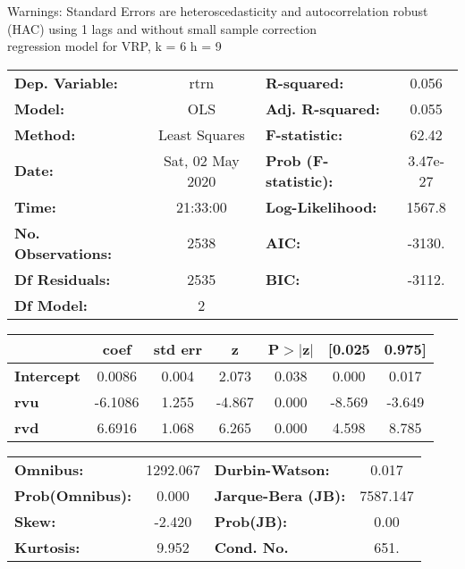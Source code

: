 Warnings: \newline
 [1] Standard Errors are heteroscedasticity and autocorrelation robust (HAC) using 1 lags and without small sample correction\\ 

regression model for VRP, k = 6 h = 9\begin{center}
\begin{tabular}{lclc}
\toprule
\textbf{Dep. Variable:}    &       rtrn       & \textbf{  R-squared:         } &     0.056   \\
\textbf{Model:}            &       OLS        & \textbf{  Adj. R-squared:    } &     0.055   \\
\textbf{Method:}           &  Least Squares   & \textbf{  F-statistic:       } &     62.42   \\
\textbf{Date:}             & Sat, 02 May 2020 & \textbf{  Prob (F-statistic):} &  3.47e-27   \\
\textbf{Time:}             &     21:33:00     & \textbf{  Log-Likelihood:    } &    1567.8   \\
\textbf{No. Observations:} &        2538      & \textbf{  AIC:               } &    -3130.   \\
\textbf{Df Residuals:}     &        2535      & \textbf{  BIC:               } &    -3112.   \\
\textbf{Df Model:}         &           2      & \textbf{                     } &             \\
\bottomrule
\end{tabular}
\begin{tabular}{lcccccc}
                   & \textbf{coef} & \textbf{std err} & \textbf{z} & \textbf{P$> |$z$|$} & \textbf{[0.025} & \textbf{0.975]}  \\
\midrule
\textbf{Intercept} &       0.0086  &        0.004     &     2.073  &         0.038        &        0.000    &        0.017     \\
\textbf{rvu}       &      -6.1086  &        1.255     &    -4.867  &         0.000        &       -8.569    &       -3.649     \\
\textbf{rvd}       &       6.6916  &        1.068     &     6.265  &         0.000        &        4.598    &        8.785     \\
\bottomrule
\end{tabular}
\begin{tabular}{lclc}
\textbf{Omnibus:}       & 1292.067 & \textbf{  Durbin-Watson:     } &    0.017  \\
\textbf{Prob(Omnibus):} &   0.000  & \textbf{  Jarque-Bera (JB):  } & 7587.147  \\
\textbf{Skew:}          &  -2.420  & \textbf{  Prob(JB):          } &     0.00  \\
\textbf{Kurtosis:}      &   9.952  & \textbf{  Cond. No.          } &     651.  \\
\bottomrule
\end{tabular}
\end{center}

